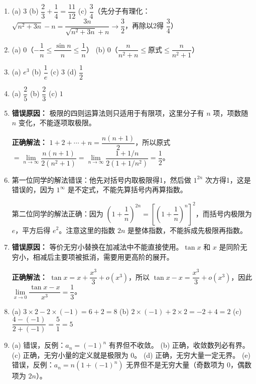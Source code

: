 \documentclass[fontset=fandol]{ctexart}
\begin{document}
\begin{enumerate}
\item[1.] 
   (a) \(3\) \quad (b) \(\dfrac{2}{3} + \dfrac{1}{4} = \dfrac{11}{12}\) \quad (c) \(\dfrac{3}{4}\)（先分子有理化：\(\sqrt{n^2+3n} - n = \dfrac{3n}{\sqrt{n^2+3n}+n} \to \dfrac{3}{2}\)，再除以2得 \(\dfrac{3}{4}\)）

\item[2.] 
   (a) \(0\)（\(-\dfrac{1}{n} \leq \dfrac{\sin n}{n} \leq \dfrac{1}{n}\)）\quad 
   (b) \(0\)（\(\dfrac{n}{n^2+n} \leq \text{原式} \leq \dfrac{n}{n^2+1}\)）

\item[3.] 
   (a) \(e^3\) \quad (b) \(\dfrac{1}{e}\) \quad (c) \(3\) \quad (d) \(\dfrac{1}{2}\)

\item[4.] 
   (a) \(\dfrac{2}{5}\) \quad (b) \(\dfrac{2}{3}\) \quad (c) \(1\)

\item[5.] 
   \textbf{错误原因：} 极限的四则运算法则只适用于有限项，这里分子有 \(n\) 项，项数随 \(n\) 变化，不能逐项取极限。
   
   \textbf{正确解法：} \(1+2+\cdots+n = \dfrac{n(n+1)}{2}\)，所以原式 \(= \lim\limits_{n\to\infty} \dfrac{n(n+1)}{2(n^2+1)} = \lim\limits_{n\to\infty} \dfrac{1+1/n}{2(1+1/n^2)} = \dfrac{1}{2}\)。

\item[6.] 
   第一位同学的解法错误：他先对括号内取极限得1，然后做 \(1^{2n}\) 次方得1，这是错误的，因为 \(1^\infty\) 是不定式，不能先算括号内再算指数。
   
   第二位同学的解法正确：因为 \(\left(1+\dfrac{1}{n}\right)^{2n} = \left[\left(1+\dfrac{1}{n}\right)^n\right]^2\)，而括号内极限为 \(e\)，平方后得 \(e^2\)。注意这里的指数 \(2n\) 是整体指数，不能拆成先极限再指数。

\item[7.] 
   \textbf{错误原因：} 等价无穷小替换在加减法中不能直接使用。\(\tan x\) 和 \(x\) 是同阶无穷小，相减后主要项被抵消，需要用更高阶的展开。
   
   \textbf{正确解法：} \(\tan x = x + \dfrac{x^3}{3} + o(x^3)\)，所以 \(\tan x - x = \dfrac{x^3}{3} + o(x^3)\)，因此 \(\lim\limits_{x\to 0} \dfrac{\tan x - x}{x^3} = \dfrac{1}{3}\)。

\item[8.] 
   (a) \(3 \times 2 - 2 \times (-1) = 6 + 2 = 8\) \quad
   (b) \(2 \times (-1) + 2 \times 2 = -2 + 4 = 2\) \quad
   (c) \(\dfrac{4 - (-1)}{2 + (-1)} = \dfrac{5}{1} = 5\)

\item[9.] 
   (a) 错误，反例：\(a_n = (-1)^n\) 有界但不收敛。\quad
   (b) 正确，收敛数列必有界。\quad
   (c) 正确，无穷小量的定义就是极限为 0。\quad
   (d) 正确，无穷大量一定无界。\quad
   (e) 错误，反例：\(a_n = n(1+(-1)^n)\) 无界但不是无穷大量（奇数项为 0，偶数项为 \(2n\)）。


\end{enumerate}
\end{document}
